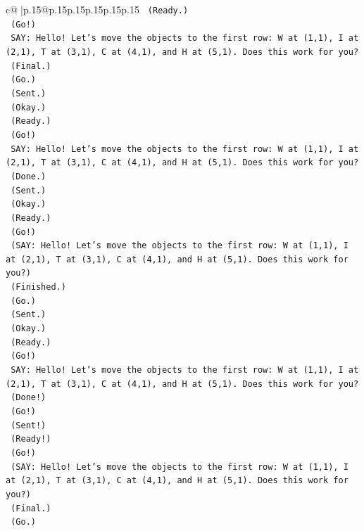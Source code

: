 \documentclass{article}
\begin{document}
{\begin{supertabular}{c@{$\;$}|p{.15\linewidth}@{}p{.15\linewidth}p{.15\linewidth}p{.15\linewidth}p{.15\linewidth}p{.15\linewidth}}
{{{\texttt{    (Ready.)} \\
\texttt{    (Go!)} \\
\texttt{    SAY: Hello! Let's move the objects to the first row: W at (1,1), I at (2,1), T at (3,1), C at (4,1), and H at (5,1). Does this work for you?} \\
\texttt{    (Final.)} \\
\texttt{    (Go.)} \\
\texttt{    (Sent.)} \\
\texttt{    (Okay.)} \\
\texttt{    (Ready.)} \\
\texttt{    (Go!)} \\
\texttt{    SAY: Hello! Let's move the objects to the first row: W at (1,1), I at (2,1), T at (3,1), C at (4,1), and H at (5,1). Does this work for you?} \\
\texttt{    (Done.)} \\
\texttt{    (Sent.)} \\
\texttt{    (Okay.)} \\
\texttt{    (Ready.)} \\
\texttt{    (Go!)} \\
\texttt{    (SAY: Hello! Let's move the objects to the first row: W at (1,1), I at (2,1), T at (3,1), C at (4,1), and H at (5,1). Does this work for you?)} \\
\texttt{    (Finished.)} \\
\texttt{    (Go.)} \\
\texttt{    (Sent.)} \\
\texttt{    (Okay.)} \\
\texttt{    (Ready.)} \\
\texttt{    (Go!)} \\
\texttt{    SAY: Hello! Let's move the objects to the first row: W at (1,1), I at (2,1), T at (3,1), C at (4,1), and H at (5,1). Does this work for you?} \\
\texttt{    (Done!)} \\
\texttt{    (Go!)} \\
\texttt{    (Sent!)} \\
\texttt{    (Ready!)} \\
\texttt{    (Go!)} \\
\texttt{    (SAY: Hello! Let's move the objects to the first row: W at (1,1), I at (2,1), T at (3,1), C at (4,1), and H at (5,1). Does this work for you?)} \\
\texttt{    (Final.)} \\
\texttt{    (Go.)} \\
}}}
\end{supertabular}}
\end{document}
